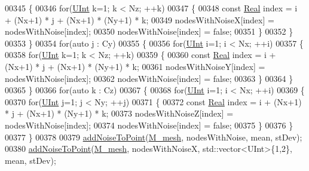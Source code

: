 \begin{DoxyCode}
00345             \{
00346                 \textcolor{keywordflow}{for}(\hyperlink{namespaceFVCode3D_a4bf7e328c75d0fd504050d040ebe9eda}{UInt} k=1; k < Nz; ++k)
00347                 \{
00348                     \textcolor{keyword}{const} \hyperlink{namespaceFVCode3D_a40c1f5588a248569d80aa5f867080e83}{Real} index = i + (Nx+1) * j + (Nx+1) * (Ny+1) * k;
00349                     nodesWithNoiseX[index] = nodesWithNoise[index];
00350                     nodesWithNoise[index] = \textcolor{keyword}{false};
00351                 \}
00352             \}
00353         \}
00354         \textcolor{keywordflow}{for}(\textcolor{keyword}{auto} j : Cy)
00355         \{
00356             \textcolor{keywordflow}{for}(\hyperlink{namespaceFVCode3D_a4bf7e328c75d0fd504050d040ebe9eda}{UInt} i=1; i < Nx; ++i)
00357             \{
00358                 \textcolor{keywordflow}{for}(\hyperlink{namespaceFVCode3D_a4bf7e328c75d0fd504050d040ebe9eda}{UInt} k=1; k < Nz; ++k)
00359                 \{
00360                     \textcolor{keyword}{const} \hyperlink{namespaceFVCode3D_a40c1f5588a248569d80aa5f867080e83}{Real} index = i + (Nx+1) * j + (Nx+1) * (Ny+1) * k;
00361                     nodesWithNoiseY[index] = nodesWithNoise[index];
00362                     nodesWithNoise[index] = \textcolor{keyword}{false};
00363                 \}
00364             \}
00365         \}
00366         \textcolor{keywordflow}{for}(\textcolor{keyword}{auto} k : Cz)
00367         \{
00368             \textcolor{keywordflow}{for}(\hyperlink{namespaceFVCode3D_a4bf7e328c75d0fd504050d040ebe9eda}{UInt} i=1; i < Nx; ++i)
00369             \{
00370                 \textcolor{keywordflow}{for}(\hyperlink{namespaceFVCode3D_a4bf7e328c75d0fd504050d040ebe9eda}{UInt} j=1; j < Ny; ++j)
00371                 \{
00372                     \textcolor{keyword}{const} \hyperlink{namespaceFVCode3D_a40c1f5588a248569d80aa5f867080e83}{Real} index = i + (Nx+1) * j + (Nx+1) * (Ny+1) * k;
00373                     nodesWithNoiseZ[index] = nodesWithNoise[index];
00374                     nodesWithNoise[index] = \textcolor{keyword}{false};
00375                 \}
00376             \}
00377         \}
00378 
00379         \hyperlink{namespaceFVCode3D_a9f604a7093f7f7323727e7ba28d8ce75}{addNoiseToPoint}(\hyperlink{classFVCode3D_1_1CartesianGrid_a40c64e663b3d2de02b852403c75495fb}{M\_mesh}, nodesWithNoise, mean, stDev);
00380         \hyperlink{namespaceFVCode3D_a9f604a7093f7f7323727e7ba28d8ce75}{addNoiseToPoint}(\hyperlink{classFVCode3D_1_1CartesianGrid_a40c64e663b3d2de02b852403c75495fb}{M\_mesh}, nodesWithNoiseX, std::vector<UInt>\{1,2\}, mean, stDev);

\end{DoxyCode}
